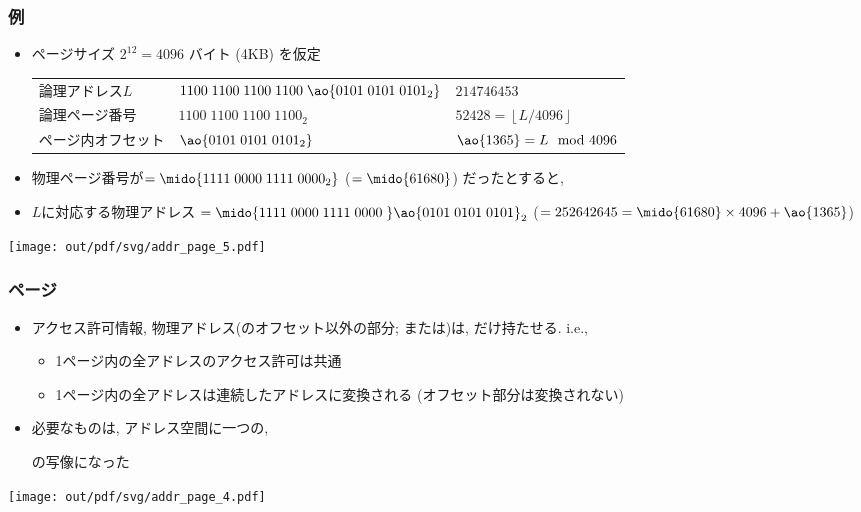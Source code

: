 \documentclass[12pt,dvipdfmx]{beamer}
\begin{document}
\begin{frame}
  \frametitle{例}
  {\scriptsize
    \begin{itemize}
      
    \item ページサイズ $2^{12} = 4096$ バイト (4KB) を仮定

      \begin{tabular}{lll}
論理アドレス$L$ & $1100\;1100\;1100\;1100\;\ao{0101\;0101\;0101_2}$ & $214746453$ \\
論理ページ番号 & $1100\;1100\;1100\;1100_2$ & $52428 = \left\lfloor L/4096\right\rfloor$ \\
ページ内オフセット & $\ao{0101\;0101\;0101_2}$ & $ \ao{1365} = L \mod 4096$ \\
      \end{tabular}
  \item 物理ページ番号が$= \mido{1111\;0000\;1111\;0000_2}$ ($= \mido{61680}$) だったとすると,
  \item $L$に対応する物理アドレス $= \mido{1111\;0000\;1111\;0000\;}\ao{0101\;0101\;0101}_2$ ($= 252642645 = \mido{61680} \times 4096 + \ao{1365}$)
  \end{itemize}}
  
  \begin{center}
    \texttt{[image: out/pdf/svg/addr\_page\_5.pdf]}
  \end{center}
\end{frame}


\begin{frame}
  \frametitle{ページ}
  \begin{itemize}
  \item アクセス許可情報, 物理アドレス(のオフセット以外の部分;
    または)は,
    だけ持たせる. i.e.,
    \begin{itemize}
    \item 1ページ内の全アドレスのアクセス許可は共通
    \item 1ページ内の全アドレスは連続したアドレスに変換される
      (オフセット部分は変換されない)
    \end{itemize}
    
  \item 必要なものは, アドレス空間に一つの,
    \begin{center}
    \end{center}
    の写像になった
  \end{itemize}
  \begin{center}
    \texttt{[image: out/pdf/svg/addr\_page\_4.pdf]}
  \end{center}
\end{frame}
\end{document}
